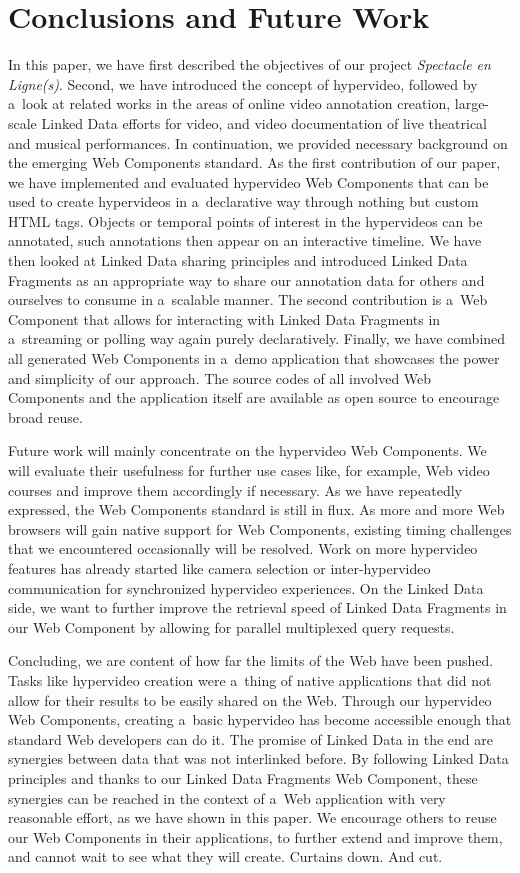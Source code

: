 \documentclass[runningheads,a4paper]{llncs}
\begin{document}
\section{Conclusions and Future Work}

In this paper, we have first described the objectives of our project \emph{Spectacle en Ligne(s)}.
Second, we have introduced the concept of hypervideo, followed by a~look at related works
in the areas of online video annotation creation, large-scale Linked Data efforts for video,
and video documentation of live theatrical and musical performances.
In continuation, we provided necessary background on the emerging Web Components standard.
As the first contribution of our paper, we have implemented and evaluated hypervideo Web Components
that can be used to create hypervideos in a~declarative way through nothing but custom HTML tags.
Objects or temporal points of interest in the hypervideos can be annotated,
such annotations then appear on an interactive timeline.
We have then looked at Linked Data sharing principles and introduced Linked Data Fragments
as an appropriate way to share our annotation data for others
and ourselves to consume in a~scalable manner.
The second contribution is a~Web Component that allows for interacting with Linked Data Fragments
in a~streaming or polling way again purely declaratively.
Finally, we have combined all generated Web Components in a~demo application
that showcases the power and simplicity of our approach.
The source codes of all involved Web Components and the application itself
are available as open source to encourage broad reuse.

Future work will mainly concentrate on the hypervideo Web Components.
We will evaluate their usefulness for further use cases like,
for example, Web video courses and improve them accordingly if necessary.
As we have repeatedly expressed, the Web Components standard is still in flux.
As more and more Web browsers will gain native support for Web Components,
existing timing challenges that we encountered occasionally will be resolved.
Work on more hypervideo features has already started like camera selection
or inter-hypervideo communication for synchronized hypervideo experiences.
On the Linked Data side, we want to further improve the retrieval speed
of Linked Data Fragments in our Web Component by allowing for parallel multiplexed query requests.

Concluding, we are content of how far the limits of the Web have been pushed.
Tasks like hypervideo creation were a~thing of native applications
that did not allow for their results to be easily shared on the Web.
Through our hypervideo Web Components, creating a~basic hypervideo
has become accessible enough that standard Web developers can do it.
The promise of Linked Data in the end are synergies between data that was not interlinked before.
By following Linked Data principles and thanks to our Linked Data Fragments Web Component,
these synergies can be reached in the context of a~Web application with very reasonable effort,
as we have shown in this paper.
We encourage others to reuse our Web Components in their applications,
to further extend and improve them, and cannot wait to see what they will create.
Curtains down. And cut.




\end{document}
